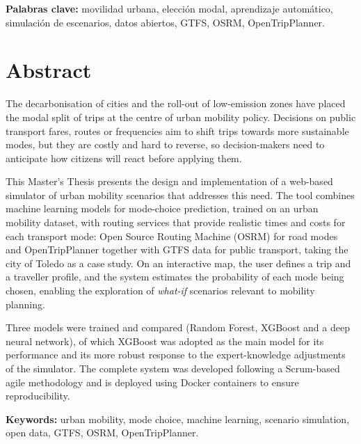 \vspace{0.5cm}
\noindent\textbf{Palabras clave:} movilidad urbana, elección modal, aprendizaje automático, simulación de escenarios, datos abiertos, GTFS, OSRM, OpenTripPlanner.


\cleardoublepage
\thispagestyle{plain}
\chapter*{Abstract}

The decarbonisation of cities and the roll-out of low-emission zones have placed the modal split of trips at the centre of urban mobility policy. Decisions on public transport fares, routes or frequencies aim to shift trips towards more sustainable modes, but they are costly and hard to reverse, so decision-makers need to anticipate how citizens will react before applying them.

This Master's Thesis presents the design and implementation of a web-based simulator of urban mobility scenarios that addresses this need. The tool combines machine learning models for mode-choice prediction, trained on an urban mobility dataset, with routing services that provide realistic times and costs for each transport mode: Open Source Routing Machine (OSRM) for road modes and OpenTripPlanner together with GTFS data for public transport, taking the city of Toledo as a case study. On an interactive map, the user defines a trip and a traveller profile, and the system estimates the probability of each mode being chosen, enabling the exploration of \textit{what-if} scenarios relevant to mobility planning.

Three models were trained and compared (Random Forest, XGBoost and a deep neural network), of which XGBoost was adopted as the main model for its performance and its more robust response to the expert-knowledge adjustments of the simulator. The complete system was developed following a Scrum-based agile methodology and is deployed using Docker containers to ensure reproducibility.

\vspace{0.5cm}
\noindent\textbf{Keywords:} urban mobility, mode choice, machine learning, scenario simulation, open data, GTFS, OSRM, OpenTripPlanner.


\cleardoublepage
\thispagestyle{plain}
\vspace*{4cm}
\begin{center}
\Large{}
\end{center}
\vskip0.5cm

